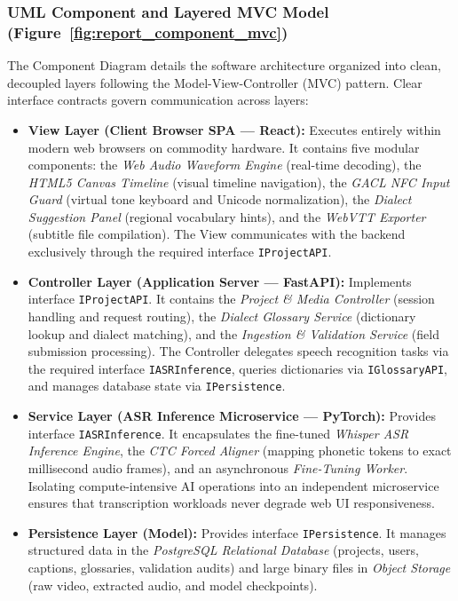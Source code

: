 \documentclass[a4paper,11pt]{article}
\begin{document}
\subsubsection{UML Component and Layered MVC Model (Figure~\ref{fig:report_component_mvc})}
\label{sec:report_uml:component}
The Component Diagram details the software architecture organized into clean, decoupled layers following the Model-View-Controller (MVC) pattern. Clear interface contracts govern communication across layers:
\begin{itemize}
    \item \textbf{View Layer (Client Browser SPA — React):} Executes entirely within modern web browsers on commodity hardware. It contains five modular components: the \textit{Web Audio Waveform Engine} (real-time decoding), the \textit{HTML5 Canvas Timeline} (visual timeline navigation), the \textit{GACL NFC Input Guard} (virtual tone keyboard and Unicode normalization), the \textit{Dialect Suggestion Panel} (regional vocabulary hints), and the \textit{WebVTT Exporter} (subtitle file compilation). The View communicates with the backend exclusively through the required interface \texttt{IProjectAPI}.
    \item \textbf{Controller Layer (Application Server — FastAPI):} Implements interface \texttt{IProjectAPI}. It contains the \textit{Project \& Media Controller} (session handling and request routing), the \textit{Dialect Glossary Service} (dictionary lookup and dialect matching), and the \textit{Ingestion \& Validation Service} (field submission processing). The Controller delegates speech recognition tasks via the required interface \texttt{IASRInference}, queries dictionaries via \texttt{IGlossaryAPI}, and manages database state via \texttt{IPersistence}.
    \item \textbf{Service Layer (ASR Inference Microservice — PyTorch):} Provides interface \texttt{IASRInference}. It encapsulates the fine-tuned \textit{Whisper ASR Inference Engine}, the \textit{CTC Forced Aligner} (mapping phonetic tokens to exact millisecond audio frames), and an asynchronous \textit{Fine-Tuning Worker}. Isolating compute-intensive AI operations into an independent microservice ensures that transcription workloads never degrade web UI responsiveness.
    \item \textbf{Persistence Layer (Model):} Provides interface \texttt{IPersistence}. It manages structured data in the \textit{PostgreSQL Relational Database} (projects, users, captions, glossaries, validation audits) and large binary files in \textit{Object Storage} (raw video, extracted audio, and model checkpoints).
\end{itemize}
\end{document}
